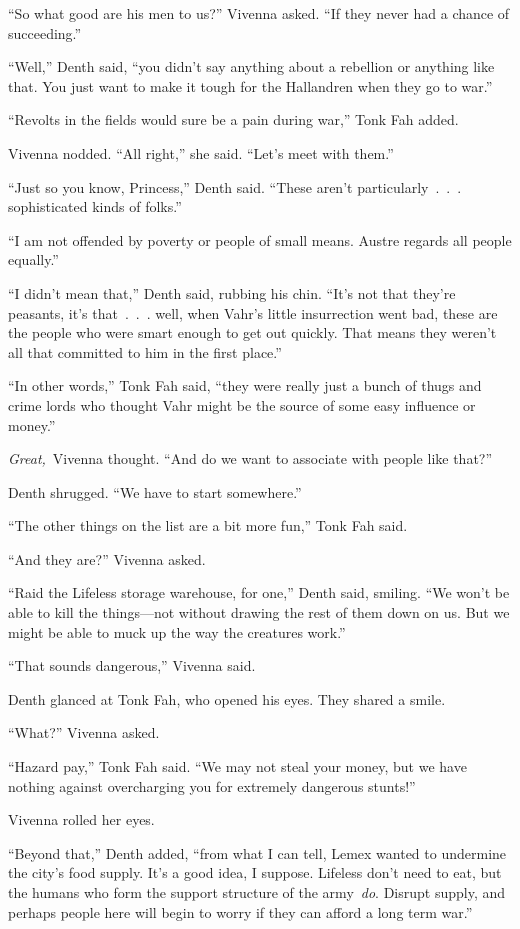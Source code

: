 “So what good are his men to us?” Vivenna asked. “If they never had a chance of succeeding.”

“Well,” Denth said, “you didn’t say anything about a rebellion or anything like that. You just want to make it tough for the Hallandren when they go to war.”

“Revolts in the fields would sure be a pain during war,” Tonk Fah added.

Vivenna nodded. “All right,” she said. “Let’s meet with them.”

“Just so you know, Princess,” Denth said. “These aren’t particularly~.~.~. sophisticated kinds of folks.”

“I am not offended by poverty or people of small means. Austre regards all people equally.”

“I didn’t mean that,” Denth said, rubbing his chin. “It’s not that they’re peasants, it’s that~.~.~. well, when Vahr’s little insurrection went bad, these are the people who were smart enough to get out quickly. That means they weren’t all that committed to him in the first place.”

“In other words,” Tonk Fah said, “they were really just a bunch of thugs and crime lords who thought Vahr might be the source of some easy influence or money.”

\textit{Great,}~Vivenna thought. “And do we want to associate with people like that?”

Denth shrugged. “We have to start somewhere.”

“The other things on the list are a bit more fun,” Tonk Fah said.

“And they are?” Vivenna asked.

“Raid the Lifeless storage warehouse, for one,” Denth said, smiling. “We won’t be able to kill the things—not without drawing the rest of them down on us. But we might be able to muck up the way the creatures work.”

“That sounds dangerous,” Vivenna said.

Denth glanced at Tonk Fah, who opened his eyes. They shared a smile.

“What?” Vivenna asked.

“Hazard pay,” Tonk Fah said. “We may not steal your money, but we have nothing against overcharging you for extremely dangerous stunts!”

Vivenna rolled her eyes.

“Beyond that,” Denth added, “from what I can tell, Lemex wanted to undermine the city’s food supply. It’s a good idea, I suppose. Lifeless don’t need to eat, but the humans who form the support structure of the army~\textit{do}. Disrupt supply, and perhaps people here will begin to worry if they can afford a long term war.”


